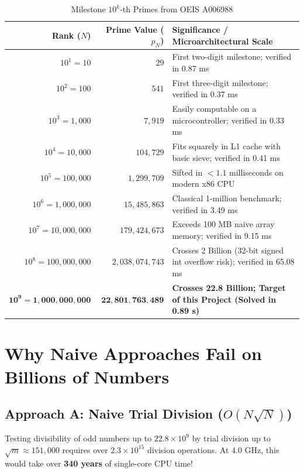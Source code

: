 \documentclass[11pt,a4paper]{article}
\begin{document}
\begin{table}[htbp]
\centering
\scriptsize
\caption{Milestone $10^k$-th Primes from OEIS A006988}
\label{tab:oeis}
\begin{tabularx}{\textwidth}{r r X}
\toprule
\textbf{Rank ($N$)} & \textbf{Prime Value ($p_N$)} & \textbf{Significance / Microarchitectural Scale} \\
\midrule
$10^1 = 10$ & $29$ & First two-digit milestone; verified in 0.87 ms \\
$10^2 = 100$ & $541$ & First three-digit milestone; verified in 0.37 ms \\
$10^3 = 1,000$ & $7,919$ & Easily computable on a microcontroller; verified in 0.33 ms \\
$10^4 = 10,000$ & $104,729$ & Fits squarely in L1 cache with basic sieve; verified in 0.41 ms \\
$10^5 = 100,000$ & $1,299,709$ & Sifted in $< 1.1$ milliseconds on modern x86 CPU \\
$10^6 = 1,000,000$ & $15,485,863$ & Classical 1-million benchmark; verified in 3.49 ms \\
$10^7 = 10,000,000$ & $179,424,673$ & Exceeds 100 MB naive array memory; verified in 9.15 ms \\
$10^8 = 100,000,000$ & $2,038,074,743$ & Crosses 2 Billion (32-bit signed int overflow risk); verified in 65.08 ms \\
$\mathbf{10^9 = 1,000,000,000}$ & $\mathbf{22,801,763,489}$ & \textbf{Crosses 22.8 Billion; Target of this Project (Solved in 0.89 s)} \\
\bottomrule
\end{tabularx}
\end{table}

\section{Why Naive Approaches Fail on Billions of Numbers}

\subsection{Approach A: Naive Trial Division \texorpdfstring{($O(N \sqrt{N})$)}{O(N sqrt(N))}}
Testing divisibility of odd numbers up to $22.8 \times 10^9$ by trial division up to $\sqrt{m} \approx 151,000$ requires over $2.3 \times 10^{15}$ division operations. At 4.0 GHz, this would take over \textbf{340 years} of single-core CPU time!
\end{document}
